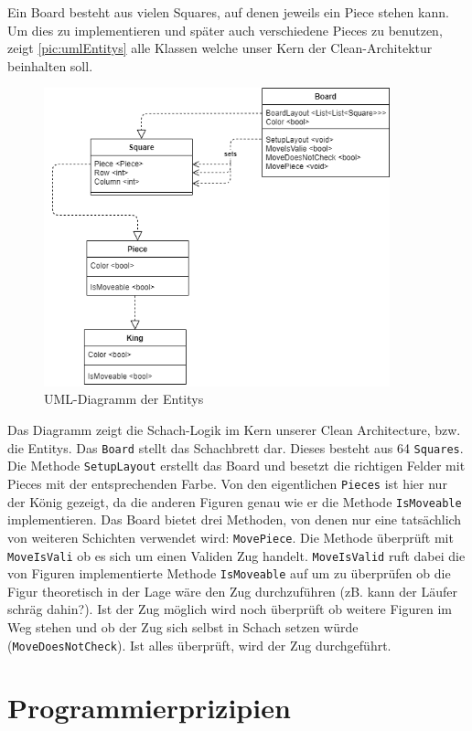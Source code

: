 \documentclass{article}
\begin{document}
Ein Board besteht aus vielen Squares, auf denen jeweils ein Piece stehen kann. Um dies zu implementieren und später auch verschiedene Pieces zu benutzen, zeigt \autoref{pic:umlEntitys} alle Klassen welche unser Kern der Clean-Architektur beinhalten soll. 
\newpage
\begin{figure}[h]
	\begin{center}
		\includegraphics[width=10cm]{entitys.png}
		\caption{\label{pic:umlEntitys} UML-Diagramm der Entitys}
	\end{center}
\end{figure}
Das Diagramm zeigt die Schach-Logik im Kern unserer Clean Architecture, bzw. die Entitys. Das \texttt{Board} stellt das Schachbrett dar. Dieses besteht aus 64 \texttt{Squares}. Die Methode \texttt{SetupLayout} erstellt das Board und besetzt die richtigen Felder mit Pieces mit der entsprechenden Farbe.
Von den eigentlichen \texttt{Pieces} ist hier nur der König gezeigt, da die anderen Figuren genau wie er die Methode \texttt{IsMoveable} implementieren. 
Das Board bietet drei Methoden, von denen nur eine tatsächlich von weiteren Schichten verwendet wird: \texttt{MovePiece}. Die Methode überprüft mit \texttt{MoveIsVali} ob es sich um einen Validen Zug handelt. \texttt{MoveIsValid} ruft dabei die von Figuren implementierte Methode \texttt{IsMoveable} auf um zu überprüfen ob die Figur theoretisch in der Lage wäre den Zug durchzuführen (zB. kann der Läufer schräg dahin?). Ist der Zug möglich wird noch überprüft ob weitere Figuren im Weg stehen und ob der Zug sich selbst in Schach setzen würde (\texttt{MoveDoesNotCheck}). Ist alles überprüft, wird der Zug durchgeführt.

\section{Programmierprizipien}
\end{document}
